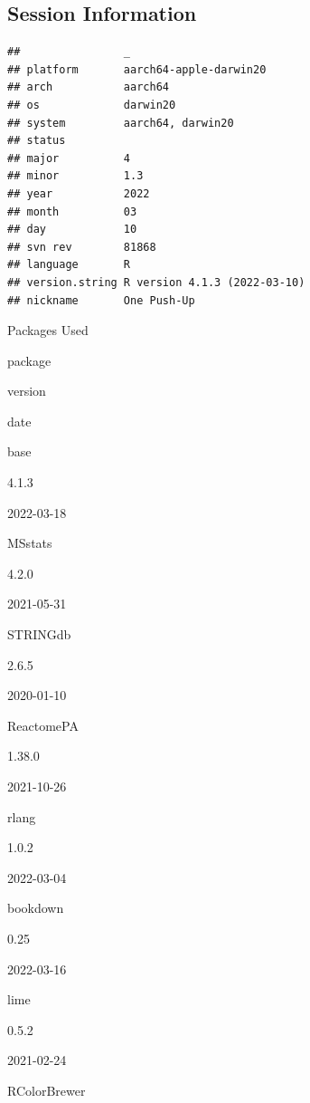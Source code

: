 \documentclass[9pt,lineno]{elife}
\begin{document}
\setcounter{table}{0}  \renewcommand{\thetable}{S\arabic{table}} \setcounter{figure}{0} \renewcommand{\thefigure}{S\arabic{figure}}

\hypertarget{session-information}{%
\subsection{Session Information}\label{session-information}}

\begin{verbatim}
##                _                           
## platform       aarch64-apple-darwin20      
## arch           aarch64                     
## os             darwin20                    
## system         aarch64, darwin20           
## status                                     
## major          4                           
## minor          1.3                         
## year           2022                        
## month          03                          
## day            10                          
## svn rev        81868                       
## language       R                           
## version.string R version 4.1.3 (2022-03-10)
## nickname       One Push-Up
\end{verbatim}

\label{tab:package-table}Packages Used

package

version

date

base

4.1.3

2022-03-18

MSstats

4.2.0

2021-05-31

STRINGdb

2.6.5

2020-01-10

ReactomePA

1.38.0

2021-10-26

rlang

1.0.2

2022-03-04

bookdown

0.25

2022-03-16

lime

0.5.2

2021-02-24

RColorBrewer
\end{document}

